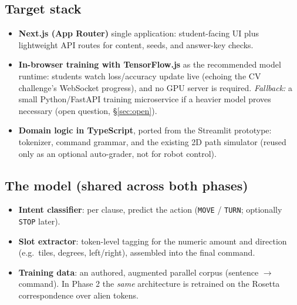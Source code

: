 \documentclass[a4]{article}
\begin{document}
\subsection*{Target stack}
\begin{itemize}[leftmargin=*]
    \item \textbf{Next.js (App Router)} single application: student-facing UI plus
    lightweight API routes for content, seeds, and answer-key checks.
    \item \textbf{In-browser training with TensorFlow.js} as the recommended model
    runtime: students watch loss/accuracy update live (echoing the CV challenge's
    WebSocket progress), and no GPU server is required. \emph{Fallback:} a small
    Python/FastAPI training microservice if a heavier model proves necessary
    (open question, \S\ref{sec:open}).
    \item \textbf{Domain logic in TypeScript}, ported from the Streamlit prototype:
    tokenizer, command grammar, and the existing 2D path simulator (reused only as
    an optional auto-grader, not for robot control).
\end{itemize}

\subsection*{The model (shared across both phases)}
\begin{itemize}[leftmargin=*]
    \item \textbf{Intent classifier}: per clause, predict the action
    (\texttt{MOVE} / \texttt{TURN}; optionally \texttt{STOP} later).
    \item \textbf{Slot extractor}: token-level tagging for the numeric amount and
    direction (e.g.\ tiles, degrees, left/right), assembled into the final command.
    \item \textbf{Training data}: an authored, augmented parallel corpus
    (sentence $\rightarrow$ command). In Phase 2 the \emph{same} architecture is
    retrained on the Rosetta correspondence over alien tokens.
\end{itemize}
\end{document}
